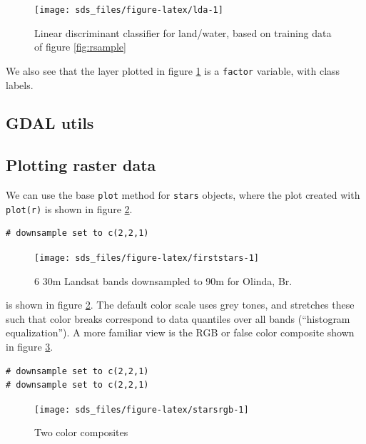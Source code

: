 \documentclass[]{book}
\begin{document}
\begin{figure}

{\centering \texttt{[image: sds\_files/figure-latex/lda-1]} 

}

\caption{Linear discriminant classifier for land/water, based on training data of figure \ref{fig:rsample}}\label{fig:lda}
\end{figure}

We also see that the layer plotted in figure \ref{fig:lda} is a
\texttt{factor} variable, with class labels.

\hypertarget{gdal-utils}{%
\subsection{GDAL utils}\label{gdal-utils}}

\hypertarget{plotting-raster-data}{%
\subsection{Plotting raster data}\label{plotting-raster-data}}

We can use the base \texttt{plot} method for \texttt{stars} objects, where the plot created with
\texttt{plot(r)} is shown in figure \ref{fig:firststars}.

\begin{verbatim}
# downsample set to c(2,2,1)
\end{verbatim}

\begin{figure}

{\centering \texttt{[image: sds\_files/figure-latex/firststars-1]} 

}

\caption{6 30m Landsat bands downsampled to 90m for Olinda, Br.}\label{fig:firststars}
\end{figure}

is shown in figure \ref{fig:firststars}.
The default color scale uses grey tones, and stretches these such
that color breaks correspond to data quantiles over all bands
(``histogram equalization''). A more familiar view is the RGB or
false color composite shown in figure \ref{fig:starsrgb}.

\begin{verbatim}
# downsample set to c(2,2,1)
# downsample set to c(2,2,1)
\end{verbatim}

\begin{figure}

{\centering \texttt{[image: sds\_files/figure-latex/starsrgb-1]} 

}

\caption{Two color composites}\label{fig:starsrgb}
\end{figure}
\end{document}

